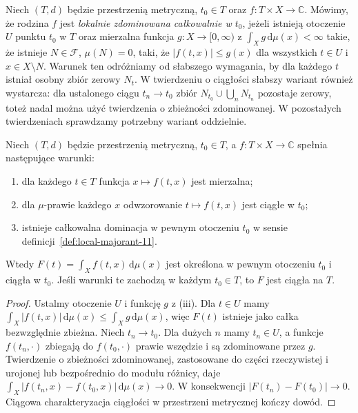 \begin{definicja}
\label{def:local-majorant-11}
Niech $(T,d)$ będzie przestrzenią metryczną, $t_0\in T$ oraz
$f:T\times X\to\mathbb C$. Mówimy, że rodzina $f$ jest
\emph{lokalnie zdominowana całkowalnie w $t_0$}, jeżeli istnieją
otoczenie $U$ punktu $t_0$ w $T$ oraz mierzalna funkcja
$g:X\to[0,\infty)$ z $\int_Xg\,\mathrm d\mu(x)<\infty$ takie, że
istnieje $N\in\mathcal F$, $\mu(N)=0$, taki, że
$|f(t,x)|\le g(x)$ dla wszystkich $t\in U$ i $x\in X\setminus N$.
Warunek ten odróżniamy od słabszego wymagania, by dla każdego $t$
istniał osobny zbiór zerowy $N_t$. W twierdzeniu o ciągłości
słabszy wariant również wystarcza: dla ustalonego ciągu
$t_n\to t_0$ zbiór $N_{t_0}\cup\bigcup_n N_{t_n}$
pozostaje zerowy, toteż nadal można użyć twierdzenia
o zbieżności zdominowanej. W pozostałych twierdzeniach
sprawdzamy potrzebny wariant oddzielnie.
\end{definicja}

\begin{twierdzenie}
\label{thm:local-continuity-11}
Niech $(T,d)$ będzie przestrzenią metryczną, $t_0\in T$,
a $f:T\times X\to\mathbb C$ spełnia następujące warunki:
\begin{enumerate}[label=\textup{(\roman*)}]
\item dla każdego $t\in T$ funkcja $x\mapsto f(t,x)$ jest mierzalna;
\item dla $\mu$-prawie każdego $x$ odwzorowanie $t\mapsto f(t,x)$
      jest ciągłe w $t_0$;
\item istnieje całkowalna dominacja w pewnym otoczeniu $t_0$
      w sensie definicji~\ref{def:local-majorant-11}.
\end{enumerate}
Wtedy $F(t)=\int_X f(t,x)\,\mathrm d\mu(x)$ jest określona
w pewnym otoczeniu $t_0$ i ciągła w $t_0$.
Jeśli warunki te zachodzą w każdym $t_0\in T$, to $F$ jest
ciągła na $T$.
\end{twierdzenie}
\begin{proof}
Ustalmy otoczenie $U$ i funkcję $g$ z (iii). Dla $t\in U$
mamy $\int_X|f(t,x)|\,\mathrm d\mu(x)\le\int_Xg\,\mathrm d\mu(x)$,
więc $F(t)$ istnieje jako całka bezwzględnie zbieżna. Niech
$t_n\to t_0$. Dla dużych $n$ mamy $t_n\in U$, a funkcje
$f(t_n,\cdot)$ zbiegają do $f(t_0,\cdot)$ prawie wszędzie i
są zdominowane przez $g$. Twierdzenie o zbieżności zdominowanej,
zastosowane do części rzeczywistej i urojonej lub bezpośrednio
do modułu różnicy, daje
$\int_X |f(t_n,x)-f(t_0,x)|\,\mathrm d\mu(x)\to0$.
W konsekwencji $|F(t_n)-F(t_0)|\to0$. Ciągowa charakteryzacja
ciągłości w przestrzeni metrycznej kończy dowód.
\end{proof}

